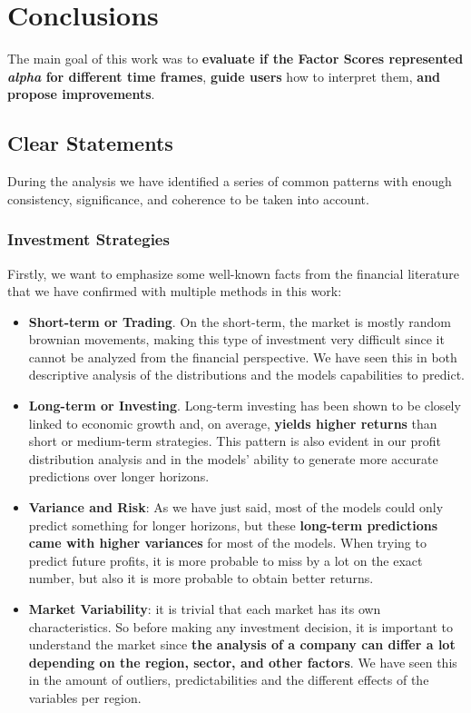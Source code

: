 \documentclass[11pt,english,a4paper,hidelinks]{book}
\begin{document}
\section{Conclusions}

The main goal of this work was to \textbf{evaluate if the Factor Scores represented \textit{alpha} for different time frames}, \textbf{guide users} how to interpret them, \textbf{and propose improvements}.

\subsection{Clear Statements}

\noindent During the analysis we have identified a series of common patterns with enough consistency, significance, and coherence to be taken into account.

\subsubsection{Investment Strategies}

\noindent Firstly, we want to emphasize some well-known facts from the financial literature that we have confirmed with multiple methods in this work:
\begin{itemize}
    \item \textbf{Short-term or Trading}. On the short-term, the market is mostly random brownian movements, making this type of investment very difficult since it cannot be analyzed from the financial perspective. We have seen this in both descriptive analysis of the distributions and the models capabilities to predict.
    \item \textbf{Long-term or Investing}. Long-term investing has been shown to be closely linked to economic growth and, on average, \textbf{yields higher returns} than short or medium-term strategies. This pattern is also evident in our profit distribution analysis and in the models’ ability to generate more accurate predictions over longer horizons.
    \item \textbf{Variance and Risk}: As we have just said, most of the models could only predict something for longer horizons, but these \textbf{long-term predictions came with higher variances} for most of the models. When trying to predict future profits, it is more probable to miss by a lot on the exact number, but also it is more probable to obtain better returns.
    \item \textbf{Market Variability}: it is trivial that each market has its own characteristics. So before making any investment decision, it is important to understand the market since \textbf{the analysis of a company can differ a lot depending on the region, sector, and other factors}. We have seen this in the amount of outliers, predictabilities and the different effects of the variables per region.
\end{itemize}
\end{document}
